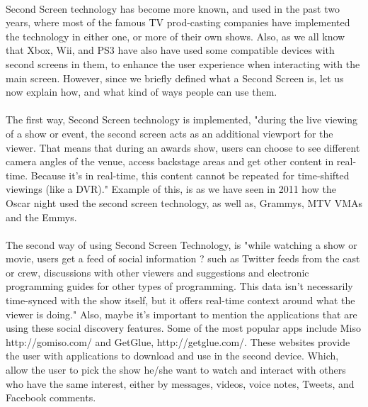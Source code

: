 \documentclass[12pt, oneside]{article}   	%
\begin{document}
 \paragraph{}
 Second Screen technology has become more known, and used in the past two years, where most of the famous TV prod-casting companies have implemented the technology in either one, or more of their own shows.  Also, as we all know that Xbox, Wii, and PS3 have also have used some compatible devices with second screens in them, to enhance the user experience when interacting with the main screen.
 However, since we briefly defined what a Second Screen is, let us now explain how, and what kind of ways people can use them.  
\paragraph{}
The first way, Second Screen technology is implemented, "during the live viewing of a show or event, the second screen acts as an additional viewport for the viewer. That means that during an awards show, users can choose to see different camera angles of the venue, access backstage areas and get other content in real-time. Because it's in real-time, this content cannot be repeated for time-shifted viewings (like a DVR)."\cite{Second-Screen-His} Example of this, is as we have seen in 2011 how the Oscar night used the second screen technology, as well as, Grammys, MTV VMAs and the Emmys.\cite{Second-Screen-His}
\paragraph{}
 The second way of using Second Screen Technology, is "while watching a show or movie, users get a feed of social information ? such as Twitter feeds from the cast or crew, discussions with other viewers and suggestions and electronic programming guides for other types of programming. This data isn't necessarily time-synced with the show itself, but it offers real-time context around what the viewer is doing."\cite{Second-Screen-His} Also, maybe it's important to mention the applications that are using these social discovery features. Some of the most popular apps include Miso http://gomiso.com/ and GetGlue, http://getglue.com/. \cite{Second-Screen-Art} These websites provide the user with applications to download and use in the second device.  Which, allow the user to pick the show he/she want to watch and interact with others who have the same interest, either by messages, videos, voice notes, Tweets, and Facebook comments.
\end{document}
